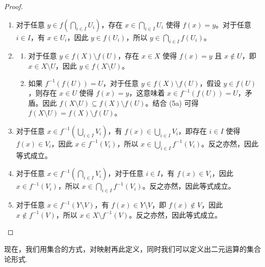 \begin{proof}
\begin{enumerate}
		\item[(4)] 对于任意 \( y \in f\left(\bigcap_{i \in I} U_i\right) \)，存在 \( x \in \bigcap_{i \in I} U_i \) 使得 \( f(x) = y \)。对于任意 \( i \in I \)，有 \( x \in U_i \)，因此 \( y \in f(U_i) \)，所以 \( y \in \bigcap_{i \in I} f(U_i) \)。
		
		\item[(5)]
		\begin{enumerate}
			\item[(a)] 对于任意 \( y \in f(X) \setminus f(U) \)，存在 \( x \in X \) 使得 \( f(x) = y \) 且 \( x \notin U \)，即 \( x \in X \setminus U \)，因此 \( y \in f(X \setminus U) \)。
			
			\item[(b)] 如果 \( f^{-1}(f(U)) = U \)，对于任意 \( y \in f(X) \setminus f(U) \)，假设 \( y \in f(U) \)，则存在 \( x \in U \) 使得 \( f(x) = y \)，这意味着 \( x \in f^{-1}(f(U)) = U \)，矛盾。因此 \( f(X \setminus U) \subseteq f(X) \setminus f(U) \)。结合 (5a) 可得 \( f(X \setminus U) = f(X) \setminus f(U) \)。 \end{enumerate}
		
		\item[(6)] 对于任意 \( x \in f^{-1}\left(\bigcup_{i \in I} V_i\right) \)，有 \( f(x) \in \bigcup_{i \in I} V_i \)，即存在 \( i \in I \) 使得 \( f(x) \in V_i \)，因此 \( x \in f^{-1}(V_i) \)，所以 \( x \in \bigcup_{i \in I} f^{-1}(V_i) \)。反之亦然，因此等式成立。
		
		\item[(7)] 对于任意 \( x \in f^{-1}\left(\bigcap_{i \in I} V_i\right) \)，对于任意 \( i \in I \)，有 \( f(x) \in V_i \)，因此 \( x \in f^{-1}(V_i) \)，所以 \( x \in \bigcap_{i \in I} f^{-1}(V_i) \)。反之亦然，因此等式成立。
		
		\item[(8)] 对于任意 \( x \in f^{-1}(Y \setminus V) \)，有 \( f(x) \in Y \setminus V \)，即 \( f(x) \notin V \)，因此 \( x \notin f^{-1}(V) \)，所以 \( x \in X \setminus f^{-1}(V) \)。反之亦然，因此等式成立。
	\end{enumerate}
\end{proof}
现在，我们用集合的方式，对映射再此定义，同时我们可以定义出二元运算的集合论形式.
